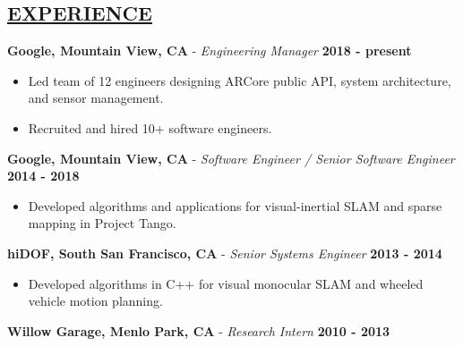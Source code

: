 \documentclass[line,margin]{res}
\newenvironment{compactlist}{
	\begin{itemize}\itemsep=0pt
}{
	\end{itemize}
}
\begin{document}

\address{164 Granada Dr, Mountain View, CA 94043}
\address{650.762.6844 $\mid$ adamleeper@gmail.com}
\address{github.com/aleeper}
\address{linkedin.com/in/adam-leeper}
\address{www.adamleeper.com}



\begin{resume}
%
\section{\underline{EXPERIENCE}}
\vspace{1.0pc}
{\bf Google, Mountain View, CA} - \emph{Engineering Manager}
  \hfill \textbf{2018 - present}
  \begin{compactlist}
    \item Led team of 12 engineers designing ARCore public API,
      system architecture, and sensor management.
    \item Recruited and hired 10+ software engineers.
  \end{compactlist}
{\bf Google, Mountain View, CA} - \emph{Software Engineer / Senior Software Engineer}
  \hfill \textbf{2014 - 2018}
  \begin{compactlist}
    \item Developed algorithms and applications for
      visual-inertial SLAM and sparse mapping in Project Tango.
  \end{compactlist}
{\bf hiDOF, South San Francisco, CA} - \emph{Senior Systems Engineer}
  \hfill \textbf{2013 - 2014}
  \begin{compactlist}
    \item Developed algorithms in C++ for visual monocular SLAM and wheeled vehicle motion planning.
  \end{compactlist}
{\bf Willow Garage, Menlo Park, CA} - \emph{Research Intern}
  \hfill \textbf{2010 - 2013}
  \begin{compactlist}

\end{compactlist}
\end{resume}
\end{document}
